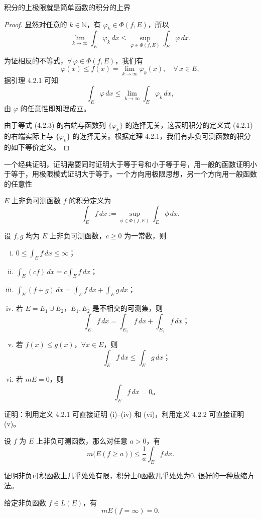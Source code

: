\documentclass[lang=cn,10pt]{elegantbook}
\begin{document}
积分的上极限就是简单函数的积分的上界
\begin{proof}
显然对任意的 $k \in \mathbb{N}$，有 $\varphi_k \in \Phi(f, E)$，所以
\[
\lim_{k \to \infty} \int_E \varphi_k \, dx
\le \sup_{\varphi \in \Phi(f, E)} \int_E \varphi \, dx.
\]

为证相反的不等式，$\forall\, \varphi \in \Phi(f, E)$，我们有
\[
\varphi(x) \le f(x) = \lim_{k \to \infty} \varphi_k(x), \quad \forall\, x \in E,
\]
据引理 4.2.1 可知
\[
\int_E \varphi \, dx \le \lim_{k \to \infty} \int_E \varphi_k \, dx,
\]
由 $\varphi$ 的任意性即知理成立。

由于等式 (4.2.3) 的右端与函数列 $\{\varphi_k\}$ 的选择无关，这表明积分的定义式 (4.2.1) 的右端实际上与 $\{\varphi_k\}$ 的选择无关。根据定理 4.2.1，我们有非负可测函数的积分的如下等价定义。
\end{proof}
一个经典证明，证明需要同时证明大于等于号和小于等于号，用一般的函数证明小于等于，用极限模式证明大于等于。一个方向用极限思想，另一个方向用一般函数的任意性
\begin{definition}[4.2.2 非负可测函数积分的等价定义]
$E$ 上非负可测函数 $f$ 的积分定义为
\[
\int_E f \, dx := \sup_{\phi \in \Phi(f, E)} \int_E \phi \, dx .
\]
\end{definition}
\begin{theorem}[积分的基本性质]\label{thm:basic_properties_integral}
设 $f, g$ 均为 $E$ 上非负可测函数，$c \ge 0$ 为一常数，则  
\begin{enumerate}[(i)]
    \item $0 \le \int_E f \, dx \le \infty$；
    \item $\int_E (cf) \, dx = c \int_E f \, dx$；
    \item $\int_E (f+g) \, dx = \int_E f \, dx + \int_E g \, dx$；
    \item 若 $E = E_1 \cup E_2$，$E_1, E_2$ 是不相交的可测集，则  
    \[
        \int_E f \, dx = \int_{E_1} f \, dx + \int_{E_2} f \, dx；
    \]
    \item 若 $f(x) \le g(x)$，$\forall x \in E$，则  
    \[
        \int_E f \, dx \le \int_E g \, dx；
    \]
    \item 若 $mE = 0$，则  
    \[
        \int_E f \, dx = 0。
    \]
\end{enumerate}
\end{theorem}

\noindent 证明：利用定义 4.2.1 可直接证明 (i)--(iv) 和 (vi)，利用定义 4.2.2 可直接证明 (v)。
\begin{theorem}
设 $f$ 为 $E$ 上非负可测函数，那么对任意 $a>0$，有
\[
m\big(E(f \ge a)\big) \le \frac{1}{a} \int_E f \, dx.
\]
\end{theorem}
证明非负可积函数上几乎处处有限，积分上0函数几乎处处为0.
很好的一种放缩方法。
\begin{theorem}[可积函数是几乎处处有限的]
给定非负函数 $f \in L(E)$，有
\[
mE(f = \infty) = 0.
\]
\end{theorem}
\end{document}
